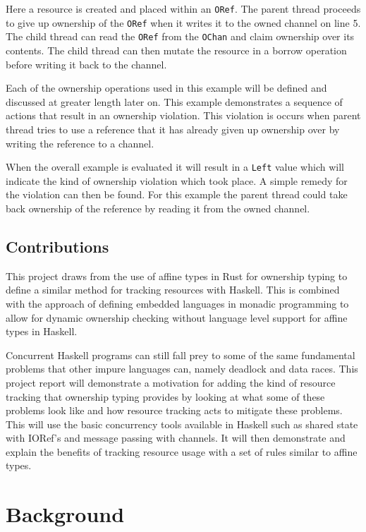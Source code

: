 \documentclass[onehalf,11pt]{beavtex}
\begin{document}
Here a resource is created and placed within an \texttt{ORef}.
The parent thread proceeds to give up ownership of the \texttt{ORef} when it
writes it to the owned channel on line 5.
The child thread can read the \texttt{ORef} from the \texttt{OChan} and claim
ownership over its contents.
The child thread can then mutate the resource in a borrow operation before
writing it back to the channel. 

Each of the ownership operations used in this example will be defined
and discussed at greater length later on.
This example demonstrates a sequence of actions that result in an ownership
violation.
This violation is occurs when parent thread tries to use a reference that it
has already given up ownership over by writing the reference to a channel.

When the overall example is evaluated it will result in a \texttt{Left} value
which will indicate the kind of ownership violation which took place.
A simple remedy for the violation can then be found.
For this example the parent thread could take back ownership of the reference by
reading it from the owned channel.

\section{Contributions}

This project draws from the use of affine types in Rust for
ownership typing to define a similar method for tracking resources with Haskell.
This is combined with the approach of defining embedded languages in monadic
programming to allow for dynamic ownership checking without language level
support for affine types in Haskell.

Concurrent Haskell programs can still fall prey to some of the same fundamental
problems that other impure languages can, namely deadlock and data races.
This project report will demonstrate a motivation for adding the kind of
resource tracking that ownership typing provides by
looking at what some of these problems look like and how resource tracking acts
to mitigate these problems.
This will use the basic concurrency tools available in Haskell
such as shared state with IORef's and message passing with channels.
It will then demonstrate and explain the benefits of tracking resource usage
with a set of rules similar to affine types.

\chapter{Background}
\end{document}
